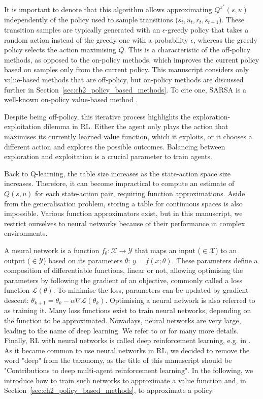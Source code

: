 It is important to denote that this algorithm allows approximating $Q^{\pi^*}(s, u)$ independently of the policy used to sample transitions ($s_t, u_t, r_t, s_{t+1}$).
These transition samples are typically generated with an $\epsilon$-greedy policy that takes a random action instead of the greedy one with a probability $\epsilon$, whereas the greedy policy selects the action maximising $Q$.
This is a characteristic of the off-policy methods, as opposed to the on-policy methods, which improves the current policy based on samples only from the current policy.
This manuscript considers only value-based methods that are off-policy, but on-policy methods are discussed further in Section~\ref{sec:ch2_policy_based_methods}.
To cite one, SARSA is a well-known on-policy value-based method \citep{sutton2018reinforcement}.

Despite being off-policy, this iterative process highlights the exploration-exploitation dilemma in RL.
Either the agent only plays the action that maximises its currently learned value function, which it exploits, or it chooses a different action and explores the possible outcomes.
Balancing between exploration and exploitation is a crucial parameter to train agents.

Back to Q-learning, the table size increases as the state-action space size increases.
Therefore, it can become impractical to compute an estimate of $Q(s, u)$ for each state-action pair, requiring function approximations.
Aside from the generalisation problem, storing a table for continuous spaces is also impossible.
Various function approximators exist, but in this manuscript, we restrict ourselves to neural networks because of their performance in complex environments.

A neural network is a function $f_\theta: \mathcal{X} \rightarrow \mathcal{Y}$ that maps an input ($\in\mathcal{X}$) to an output ($\in\mathcal{Y}$) based on its parameters $\theta$: $y = f(x;\theta)$.
These parameters define a composition of differentiable functions, linear or not, allowing optimising the parameters by following the gradient of an objective, commonly called a loss function $\mathcal{L}(\theta)$.
To minimise the loss, parameters can be updated by gradient descent: $\theta_{k+1} = \theta_k - \alpha \nabla \mathcal{L}(\theta_k)$.
Optimising a neural network is also referred to as training it.
Many loss functions exist to train neural networks, depending on the function to be approximated.
Nowadays, neural networks are very large, leading to the name of deep learning.
We refer to \citep{zhang2023dive} or \citep{prince2023understanding} for many more details.
Finally, RL with neural networks is called deep reinforcement learning, e.g. in \citep{introDeepRL}.
As it became common to use neural networks in RL, we decided to remove the word "deep" from the taxonomy, as the title of this manuscript should be "Contributions to deep multi-agent reinforcement learning".
In the following, we introduce how to train such networks to approximate a value function and, in Section~\ref{sec:ch2_policy_based_methods}, to approximate a policy.


